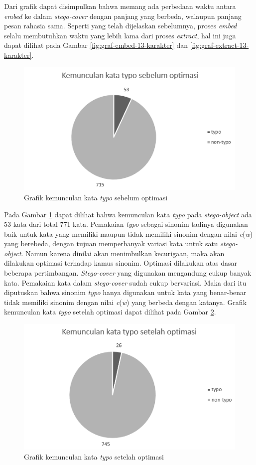 Dari grafik dapat disimpulkan bahwa memang ada perbedaan waktu antara \textit{embed} ke dalam \textit{stego-cover} dengan panjang yang berbeda, walaupun panjang pesan rahasia sama. Seperti yang telah dijelaskan sebelumnya, proses \textit{embed} selalu membutuhkan waktu yang lebih lama dari proses \textit{extract}, hal ini juga dapat dilihat pada Gambar \ref{fig:graf-embed-13-karakter} dan \ref{fig:graf-extract-13-karakter}.

\begin{figure}[H]
	\centering
	\includegraphics[scale=0.8]{Gambar/graf-typo-before}
	\caption{Grafik kemunculan kata \textit{typo} sebelum optimasi} 
	\label{fig:graf-typo-before}
\end{figure}

Pada Gambar \ref{fig:graf-typo-before} dapat dilihat bahwa kemunculan kata \textit{typo} pada \textit{stego-object} ada 53 kata dari total 771 kata. Pemakaian \textit{typo} sebagai sinonim tadinya digunakan baik untuk kata yang memiliki maupun tidak memiliki sinonim dengan nilai \textit{c}(\textit{w}) yang berebeda, dengan tujuan memperbanyak variasi kata untuk satu \textit{stego-object}. Namun karena dinilai akan menimbulkan kecurigaan, maka akan dilakukan optimasi terhadap kamus sinonim. Optimasi dilakukan atas dasar beberapa pertimbangan. \textit{Stego-cover} yang digunakan mengandung cukup banyak kata. Pemakaian kata dalam \textit{stego-cover} sudah cukup bervariasi. Maka dari itu diputuskan bahwa sinonim \textit{typo} hanya digunakan untuk kata yang benar-benar tidak memiliki sinonim dengan nilai \textit{c}(\textit{w}) yang berbeda dengan katanya. Grafik kemunculan kata \textit{typo} setelah optimasi dapat dilihat pada Gambar \ref{fig:graf-typo-after}.

\begin{figure}[H]
	\centering
	\includegraphics[scale=0.8]{Gambar/graf-typo-after}
	\caption{Grafik kemunculan kata \textit{typo} setelah optimasi} 
	\label{fig:graf-typo-after}
\end{figure}